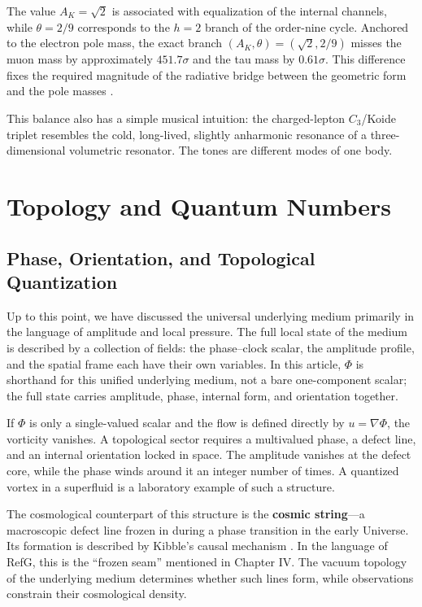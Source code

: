\documentclass[11pt,a4paper]{article}
\begin{document}
The value $A_K=\sqrt2$ is associated with equalization of the internal channels, while $\theta=2/9$ corresponds to the $h=2$ branch of the order-nine cycle. Anchored to the electron pole mass, the exact branch $(A_K,\theta)=(\sqrt2,2/9)$ misses the muon mass by approximately $451.7\sigma$ and the tau mass by $0.61\sigma$. This difference fixes the required magnitude of the radiative bridge between the geometric form and the pole masses \citep{sumino2009}.

This balance also has a simple musical intuition: the charged-lepton $C_3$/Koide triplet resembles the cold, long-lived, slightly anharmonic resonance of a three-dimensional volumetric resonator. The tones are different modes of one body.

\section{Topology and Quantum Numbers}

\subsection{Phase, Orientation, and Topological Quantization}

Up to this point, we have discussed the universal underlying medium primarily in the language of amplitude and local pressure. The full local state of the medium is described by a collection of fields: the phase--clock scalar, the amplitude profile, and the spatial frame each have their own variables. In this article, $\Phi$ is shorthand for this unified underlying medium, not a bare one-component scalar; the full state carries amplitude, phase, internal form, and orientation together.

If $\Phi$ is only a single-valued scalar and the flow is defined directly by $u=\nabla\Phi$, the vorticity vanishes. A topological sector requires a multivalued phase, a defect line, and an internal orientation locked in space. The amplitude vanishes at the defect core, while the phase winds around it an integer number of times. A quantized vortex in a superfluid is a laboratory example of such a structure.

The cosmological counterpart of this structure is the \textbf{cosmic string}---a macroscopic defect line frozen in during a phase transition in the early Universe. Its formation is described by Kibble's causal mechanism \citep{kibble1976}. In the language of RefG, this is the “frozen seam” mentioned in Chapter IV. The vacuum topology of the underlying medium determines whether such lines form, while observations constrain their cosmological density.
\end{document}
